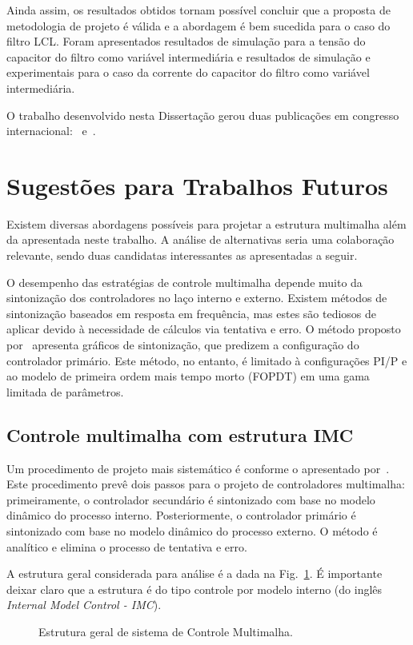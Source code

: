   Ainda assim, os resultados obtidos tornam possível concluir que a proposta de metodologia de projeto é válida e a abordagem é bem sucedida para o caso do filtro LCL. Foram apresentados resultados de simulação para a tensão do capacitor do filtro como variável intermediária e resultados de simulação e experimentais para o caso da corrente do capacitor do filtro como variável intermediária.

  O trabalho desenvolvido nesta Dissertação gerou duas publicações em congresso internacional:~\cite{ref:IECON_2012} e~\cite{ref:IECON_2013}.

\section{Sugestões para Trabalhos Futuros}

  Existem diversas abordagens possíveis para projetar a estrutura multimalha além da apresentada neste trabalho. A análise de alternativas seria uma colaboração relevante, sendo duas candidatas interessantes as apresentadas a seguir.

  O desempenho das estratégias de controle multimalha depende muito da sintonização dos controladores no laço interno e externo. Existem métodos de sintonização baseados em resposta em frequência, mas estes são tediosos de aplicar devido à necessidade de cálculos via tentativa e erro. O método proposto por~\cite{ref:KRISHNA} apresenta gráficos de sintonização, que predizem a configuração do controlador primário. Este método, no entanto, é limitado à configurações PI/P e ao modelo de primeira ordem mais tempo morto (FOPDT) em uma gama limitada de parâmetros.

  \subsection{Controle multimalha com estrutura IMC}

  Um procedimento de projeto mais sistemático é conforme o apresentado por~\cite{ref:LEE}. Este procedimento prevê dois passos para o projeto de controladores multimalha: primeiramente, o controlador secundário é sintonizado com base no modelo dinâmico do processo interno. Posteriormente, o controlador primário é sintonizado com base no modelo dinâmico do processo externo. O método é analítico e elimina o processo de tentativa e erro.

  A estrutura geral considerada para análise é a dada na
  Fig.~\ref{fig:multiloop_lee}. É importante deixar claro que a estrutura é do tipo controle por modelo interno (do inglês \emph{Internal Model Control - IMC}).
  \begin{figure}[htb]
    \centering
      \def\svgwidth{\textwidth}
      
    \renewcommand\figurename{Fig.}
    \caption{Estrutura geral de sistema de Controle Multimalha.}
    \label{fig:multiloop_lee}
  \end{figure}


